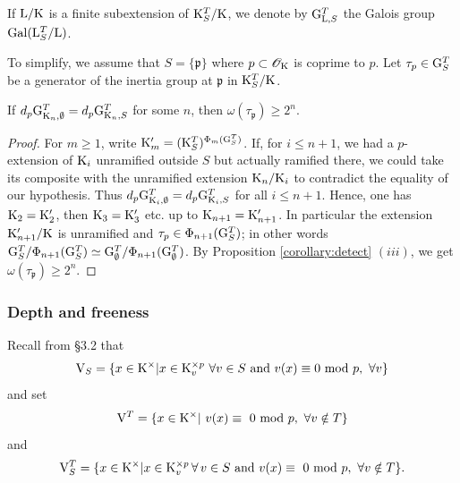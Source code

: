 \documentclass[12pt,a4paper,twoside,english]{smfart}
\def\p{{\mathfrak p}}
\def\G{{\rm G}}
\def\K{{\rm K}}
\def\L{{\rm L}}
\def\V{{\rm V}}
\def\O{{\mathcal O}}
\def\Gal{{\rm Gal}}
\begin{document}
If $\L/\K$ is a finite subextension of $\K_S^T/\K$, we denote by $\G_{\L,S}^T$ the Galois group $\Gal(\L_S^T/\L)$.


\smallskip

To simplify, we assume that $S=\{\p\}$ where $\p \subset \O_\K$ is coprime to $p$. Let $\tau_\p \in \G_S^T$ be a generator of the inertia group at $\p$ in $\K_S^T/\K$.



\begin{lemm} \label{lemma:detectlevel}
If $d_p \G_{\K_n,\emptyset}^T=d_p \G_{\K_n,S}^T$ for some $n$, then $\omega(\tau_\p) \geq 2^{n}$.
\end{lemm}


\begin{proof}For $m\geq 1$, write  $\K_m'=(\K_S^T)^{\Phi_m(\G_S^T)}$. 
If, for $i \leq n+1$, we had a $p$-extension of $\K_i$ unramified outside $S$ but actually ramified there, we could take its composite with the unramified
extension $\K_n/\K_i$ 
to contradict the equality of our hypothesis. Thus
 $d_p \G_{\K_i,\emptyset}^T=d_p \G_{\K_i,S}^T$ for all   $i\leq n+1$. 
Hence, one has $\K_2= \K_2'$,  then $\K_3=\K_3'$ etc.  up to $\K_{n+1}=\K_{n+1}'$. In particular the extension $\K_{n+1}'/\K$ is unramified and  $\tau_\p \in \Phi_{n+1}(\G_S^{T})$; in other words $\G_S^T/\Phi_{n+1}(\G_S^{T}) \simeq \G_\emptyset^T/\Phi_{n+1}(\G_\emptyset^{T})$. By Proposition \ref{corollary:detect} $(iii)$, we get $\omega(\tau_\p) \geq 2^n$.
\end{proof}

\subsubsection{Depth and freeness}
 Recall from \S 3.2 that
  $$\V_S=\{x\in \K^{\times} | x \in \K^{\times p}_v \ \forall v \in S  \mbox{ and} \ v(x) \equiv 0 \mbox{ mod } p , \ \forall v\}$$ and
set  $$\V^T=\{x\in \K^{\times} | \ v(x)\equiv \ 0  \ {\rm mod}  \  p, \ \forall v \notin T\}$$ and
$$\V^T_S=\{x\in \K^{\times} |  x \in \K^{\times p}_v \, \forall \,v \in S \mbox{ and}   \ v(x)\equiv \ 0  \ {\rm mod}  \  p, \ \forall v \notin T  \}.$$
\end{document}

